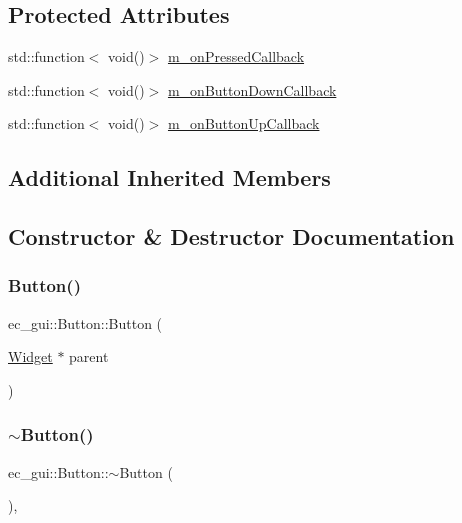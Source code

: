 \subsection*{Protected Attributes}
\begin{DoxyCompactItemize}
\item 
std\+::function$<$ void()$>$ \mbox{\hyperlink{classec__gui_1_1_button_aa4c9556354fa7cdd1f0365bccd1d2e28}{m\+\_\+on\+Pressed\+Callback}}
\item 
std\+::function$<$ void()$>$ \mbox{\hyperlink{classec__gui_1_1_button_a64f82706542dbeb39b5b0db328040bce}{m\+\_\+on\+Button\+Down\+Callback}}
\item 
std\+::function$<$ void()$>$ \mbox{\hyperlink{classec__gui_1_1_button_a7a45721355492e635fe2d49578b22e23}{m\+\_\+on\+Button\+Up\+Callback}}
\end{DoxyCompactItemize}
\subsection*{Additional Inherited Members}


\subsection{Constructor \& Destructor Documentation}
\mbox{\label{classec__gui_1_1_button_a179c52041fa20bbfc088020bafc31056}} 
\subsubsection{\texorpdfstring{Button()}{Button()}}
{\footnotesize\ttfamily ec\+\_\+gui\+::\+Button\+::\+Button (\begin{DoxyParamCaption}\item[{\mbox{\hyperlink{classec__gui_1_1_widget}{Widget}} $\ast$}]{parent }\end{DoxyParamCaption})\hspace{0.3cm}{\ttfamily [explicit]}}

\mbox{\label{classec__gui_1_1_button_a4e6b3dc59f83c39f5f644e8040f7577f}} 
\subsubsection{\texorpdfstring{$\sim$\+Button()}{~Button()}}
{\footnotesize\ttfamily ec\+\_\+gui\+::\+Button\+::$\sim$\+Button (\begin{DoxyParamCaption}{ }\end{DoxyParamCaption})\hspace{0.3cm}{\ttfamily [virtual]}, {\ttfamily [default]}}




